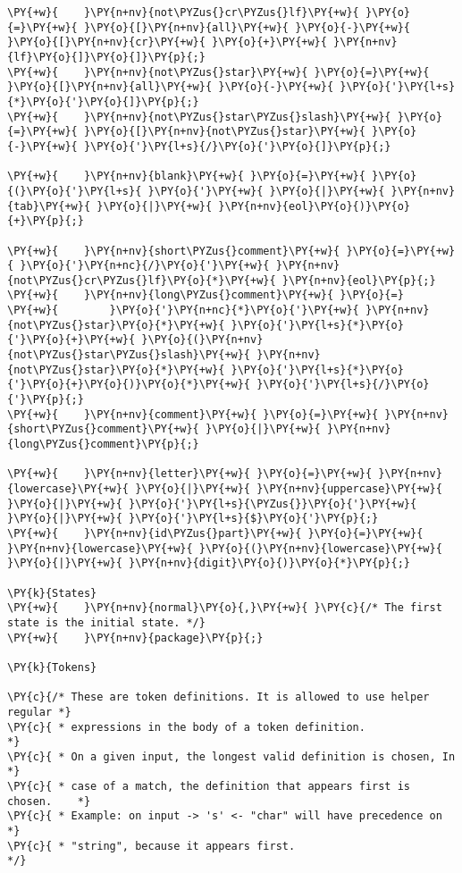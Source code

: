 \begin{Verbatim}[commandchars=\\\{\}]
\PY{+w}{    }\PY{n+nv}{not\PYZus{}cr\PYZus{}lf}\PY{+w}{ }\PY{o}{=}\PY{+w}{ }\PY{o}{[}\PY{n+nv}{all}\PY{+w}{ }\PY{o}{-}\PY{+w}{ }\PY{o}{[}\PY{n+nv}{cr}\PY{+w}{ }\PY{o}{+}\PY{+w}{ }\PY{n+nv}{lf}\PY{o}{]}\PY{o}{]}\PY{p}{;}
\PY{+w}{    }\PY{n+nv}{not\PYZus{}star}\PY{+w}{ }\PY{o}{=}\PY{+w}{ }\PY{o}{[}\PY{n+nv}{all}\PY{+w}{ }\PY{o}{-}\PY{+w}{ }\PY{o}{'}\PY{l+s}{*}\PY{o}{'}\PY{o}{]}\PY{p}{;}
\PY{+w}{    }\PY{n+nv}{not\PYZus{}star\PYZus{}slash}\PY{+w}{ }\PY{o}{=}\PY{+w}{ }\PY{o}{[}\PY{n+nv}{not\PYZus{}star}\PY{+w}{ }\PY{o}{-}\PY{+w}{ }\PY{o}{'}\PY{l+s}{/}\PY{o}{'}\PY{o}{]}\PY{p}{;}

\PY{+w}{    }\PY{n+nv}{blank}\PY{+w}{ }\PY{o}{=}\PY{+w}{ }\PY{o}{(}\PY{o}{'}\PY{l+s}{ }\PY{o}{'}\PY{+w}{ }\PY{o}{|}\PY{+w}{ }\PY{n+nv}{tab}\PY{+w}{ }\PY{o}{|}\PY{+w}{ }\PY{n+nv}{eol}\PY{o}{)}\PY{o}{+}\PY{p}{;}

\PY{+w}{    }\PY{n+nv}{short\PYZus{}comment}\PY{+w}{ }\PY{o}{=}\PY{+w}{ }\PY{o}{'}\PY{n+nc}{/}\PY{o}{'}\PY{+w}{ }\PY{n+nv}{not\PYZus{}cr\PYZus{}lf}\PY{o}{*}\PY{+w}{ }\PY{n+nv}{eol}\PY{p}{;}
\PY{+w}{    }\PY{n+nv}{long\PYZus{}comment}\PY{+w}{ }\PY{o}{=}
\PY{+w}{        }\PY{o}{'}\PY{n+nc}{*}\PY{o}{'}\PY{+w}{ }\PY{n+nv}{not\PYZus{}star}\PY{o}{*}\PY{+w}{ }\PY{o}{'}\PY{l+s}{*}\PY{o}{'}\PY{o}{+}\PY{+w}{ }\PY{o}{(}\PY{n+nv}{not\PYZus{}star\PYZus{}slash}\PY{+w}{ }\PY{n+nv}{not\PYZus{}star}\PY{o}{*}\PY{+w}{ }\PY{o}{'}\PY{l+s}{*}\PY{o}{'}\PY{o}{+}\PY{o}{)}\PY{o}{*}\PY{+w}{ }\PY{o}{'}\PY{l+s}{/}\PY{o}{'}\PY{p}{;}
\PY{+w}{    }\PY{n+nv}{comment}\PY{+w}{ }\PY{o}{=}\PY{+w}{ }\PY{n+nv}{short\PYZus{}comment}\PY{+w}{ }\PY{o}{|}\PY{+w}{ }\PY{n+nv}{long\PYZus{}comment}\PY{p}{;}

\PY{+w}{    }\PY{n+nv}{letter}\PY{+w}{ }\PY{o}{=}\PY{+w}{ }\PY{n+nv}{lowercase}\PY{+w}{ }\PY{o}{|}\PY{+w}{ }\PY{n+nv}{uppercase}\PY{+w}{ }\PY{o}{|}\PY{+w}{ }\PY{o}{'}\PY{l+s}{\PYZus{}}\PY{o}{'}\PY{+w}{ }\PY{o}{|}\PY{+w}{ }\PY{o}{'}\PY{l+s}{$}\PY{o}{'}\PY{p}{;}
\PY{+w}{    }\PY{n+nv}{id\PYZus{}part}\PY{+w}{ }\PY{o}{=}\PY{+w}{ }\PY{n+nv}{lowercase}\PY{+w}{ }\PY{o}{(}\PY{n+nv}{lowercase}\PY{+w}{ }\PY{o}{|}\PY{+w}{ }\PY{n+nv}{digit}\PY{o}{)}\PY{o}{*}\PY{p}{;}

\PY{k}{States}
\PY{+w}{    }\PY{n+nv}{normal}\PY{o}{,}\PY{+w}{ }\PY{c}{/* The first state is the initial state. */}
\PY{+w}{    }\PY{n+nv}{package}\PY{p}{;}

\PY{k}{Tokens}

\PY{c}{/* These are token definitions. It is allowed to use helper regular *}
\PY{c}{ * expressions in the body of a token definition.                   *}
\PY{c}{ * On a given input, the longest valid definition is chosen, In     *}
\PY{c}{ * case of a match, the definition that appears first is chosen.    *}
\PY{c}{ * Example: on input -> 's' <- "char" will have precedence on       *}
\PY{c}{ * "string", because it appears first.                              */}


\end{Verbatim}
